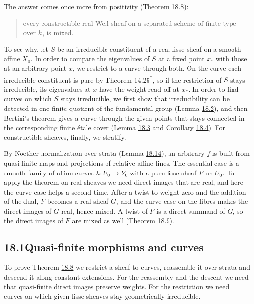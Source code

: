 \documentclass[11pt]{article}
\newcommand{\bpout}[1]{#1\textsuperscript{\hyperlink{bp-outside}{\ensuremath{\ast}}}}
\begin{document}
The answer comes once more from positivity (Theorem \hyperref[bp25]{18.8}):

\begin{quote}
every constructible real Weil sheaf on a separated scheme of finite type over \(k_0\) is mixed.
\end{quote}

To see why, let \(S\) be an irreducible constituent of a real lisse sheaf on a smooth affine \(X_0\). In order to compare the eigenvalues of \(S\) at a fixed point \(x_*\) with those at an arbitrary point \(x\), we restrict to a curve through both. On the curve each irreducible constituent is pure by Theorem \bpout{14.26}, so if the restriction of \(S\) stays irreducible, its eigenvalues at \(x\) have the weight read off at \(x_*\). In order to find curves on which \(S\) stays irreducible, we first show that irreducibility can be detected in one finite quotient of the fundamental group (Lemma \hyperref[bp8]{18.2}), and then Bertini's theorem gives a curve through the given points that stays connected in the corresponding finite étale cover (Lemma \hyperref[bp11]{18.3} and Corollary \hyperref[bp14]{18.4}). For constructible sheaves, finally, we stratify.

By Noether normalization over strata (Lemma \hyperref[bp42]{18.14}), an arbitrary \(f\) is built from quasi-finite maps and projections of relative affine lines. The essential case is a smooth family of affine curves \(h:U_0\to Y_0\) with a pure lisse sheaf \(F\) on \(U_0\). To apply the theorem on real sheaves we need direct images that are real, and here the curve case helps a second time. After a twist to weight zero and the addition of the dual, \(F\) becomes a real sheaf \(G\), and the curve case on the fibres makes the direct images of \(G\) real, hence mixed. A twist of \(F\) is a direct summand of \(G\), so the direct images of \(F\) are mixed as well (Theorem \hyperref[bp29]{18.9}).

\subsection*{\texorpdfstring{18.1\quad Quasi-finite morphisms and curves}{18.1 Quasi-finite morphisms and curves}}
\label{bp3}%
\label{bp4}%
To prove Theorem \hyperref[bp25]{18.8} we restrict a sheaf to curves, reassemble it over strata and descend it along constant extensions. For the reassembly and the descent we need that quasi-finite direct images preserve weights. For the restriction we need curves on which given lisse sheaves stay geometrically irreducible.
\end{document}
